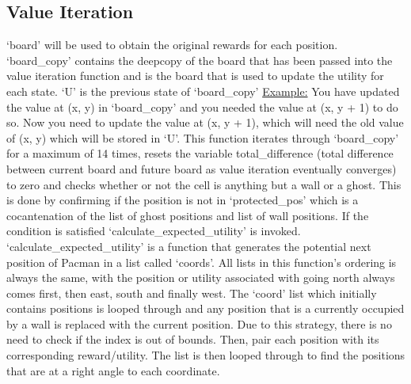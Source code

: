 \documentclass[12pt]{report}
\begin{document}
      \subsection*{Value Iteration}
        `board' will be used to obtain the original rewards for each position.
        \newline `board\_copy' contains the deepcopy of the board that has been passed into the value iteration function and is the board that is used to update the utility for each state.
        \newline `U' is the previous state of `board\_copy'
        \newline
        \newline \hspace*{1cm} \underline{Example:}
        \newline \hspace*{1cm} You have updated the value at (x, y) in `board\_copy' and you needed the value at (x, y + 1) \hspace*{1cm} to do so. Now you need to update the value at (x, y + 1), which will need the old value of (x, \hspace*{1cm} y) which will be stored in `U'.
        \newline \newline
        This function iterates through `board\_copy' for a maximum of 14 times, resets the variable total\_difference (total difference between current board and future board as value iteration eventually converges) to zero and checks whether or not the cell is anything but a wall or a ghost. This is done by confirming if the position is not in `protected\_pos' which is a cocantenation of the list of ghost positions and list of wall positions. If the condition is satisfied `calculate\_expected\_utility' is invoked.
        \newline \newline
        `calculate\_expected\_utility' is a function that generates the potential next position of Pacman in a list called `coords'. All lists in this function's ordering is always the same, with the position or utility associated with going north always comes first, then east, south and finally west. The `coord' list which initially contains positions is looped through and any position that is a currently occupied by a wall is replaced with the current position. Due to this strategy, there is no need to check if the index is out of bounds. Then, pair each position with its corresponding reward/utility. The list is then looped through to find the positions that are at a right angle to each coordinate.
\end{document}
